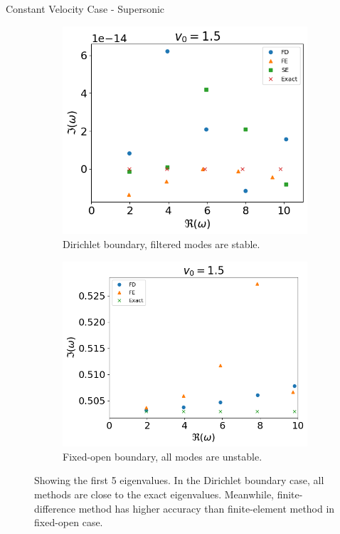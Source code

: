 \begin{frame}{Constant Velocity Case - Supersonic}
  \begin{figure}[H]
    \begin{subfigure}{0.45\textwidth}
      \centering
      \includegraphics[width=0.9\linewidth]{figures/numerical-experiments/fixed-fixed/constant-v-v0=1.5}
      \caption{Dirichlet boundary, filtered modes are stable.}
    \end{subfigure}%
    \begin{subfigure}{0.45\textwidth}
      \includegraphics[width=\linewidth]{figures/numerical-experiments/fixed-open/constant-v-v0=1.5}
      \caption{Fixed-open boundary, all modes are unstable.}
    \end{subfigure}
    \caption{Showing the first 5 eigenvalues. In the Dirichlet boundary case, all methods are close to the exact eigenvalues. Meanwhile, finite-difference method has higher accuracy than finite-element method in fixed-open case.}
    \label{fig:constant-v-fixed-open}
  \end{figure}
\end{frame}

